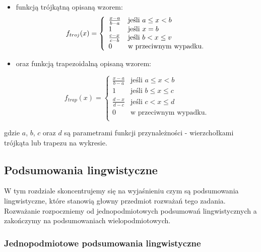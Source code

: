 \documentclass{classrep}
\begin{document}
\begin{itemize}[label=$\bullet$\scshape\bfseries]
\item funkcją trójkątną opisaną wzorem:
\begin{equation}
{f}_{troj}(x)= \left\{ \begin{array}{ll}
\frac{x-a}{b-a} 	& \textrm{jeśli $a \leq x < b$} \\
1 			& \textrm{jeśli $ x = b $} \\
\frac{c-x}{c-b} 	& \textrm{jeśli $b < x \leq v$} \\
0 			& \textrm{w przeciwnym wypadku.} \\
\end{array} \right.
\end{equation}


\item oraz funkcją trapezoidalną opisaną wzorem:

\begin{equation}
{f}_{trap}(x)= \left\{ \begin{array}{ll}
\frac{x-a}{b-a} 	& \textrm{jeśli $a \leq x < b$} \\
1 			& \textrm{jeśli $b \leq x \leq c$} \\
\frac{d-x}{d-c} 	& \textrm{jeśli $c < x \leq d$} \\
0 			& \textrm{w przeciwnym wypadku.} \\
\end{array} \right.
\end{equation}


\end{itemize}

gdzie $a$, $b$, $c$ oraz $d$ są parametrami funkcji przynależności - wierzchołkami trójkąta lub trapezu na wykresie.


\subsection{Podsumowania lingwistyczne}

W tym rozdziale skoncentrujemy się na wyjaśnieniu czym są podsumowania lingwistyczne, które stanowią głowny przedmiot rozważań tego zadania. Rozważanie rozpoczniemy od jednopodmiotowych podsumowań lingwistycznych a zakończymy na podsumowaniach wielopodmiotowych. \newline

\subsubsection{Jednopodmiotowe podsumowania lingwistyczne}
\end{document}
